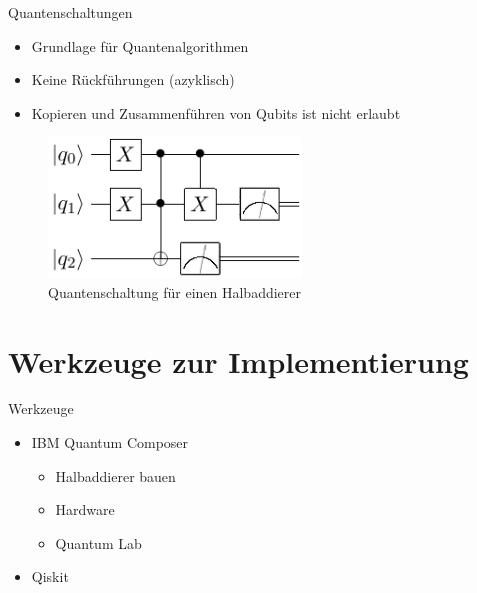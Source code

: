 \documentclass[compress,aspectratio=1610]{beamer}
\begin{document}
\begin{frame}{Quantenschaltungen}
  \begin{itemize}
  \item Grundlage f\"ur Quantenalgorithmen
  \item Keine R\"uckf\"uhrungen (azyklisch)
  \item Kopieren und Zusammenf\"uhren von Qubits ist nicht erlaubt
  \end{itemize}
  \begin{figure}[h]
    \centering
    \includegraphics[width=0.6\textwidth]{figures/half-adder.pdf}
    \caption{Quantenschaltung f\"ur einen Halbaddierer}
  \end{figure}
\end{frame}

\section{Werkzeuge zur Implementierung}
\begin{frame}{Werkzeuge}
  \begin{itemize}
  \item IBM Quantum Composer
    \begin{itemize}
    \item Halbaddierer bauen
    \item Hardware 
    \item Quantum Lab
    \end{itemize}
  \item Qiskit
  \end{itemize}
\end{frame}
\end{document}
